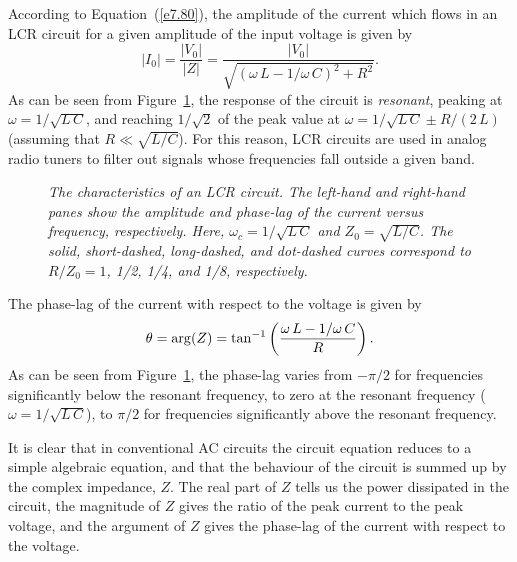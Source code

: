 According to Equation~(\ref{e7.80}), the amplitude of the current which flows in an LCR circuit
for a given amplitude of the input voltage  is
given by
\begin{equation}
|I_0| = \frac{|V_0|}{|Z|}= \frac{|V_0|}{\sqrt{(\omega \,L-1/\omega \,C)^2 + R^2}}.
\end{equation}
As can be seen from Figure~\ref{flcr1}, the response of the circuit is
  {\em resonant}, peaking at $\omega = 1/\sqrt{L\,C}$, and reaching
$1/\sqrt{2}$ of the peak value at $\omega = 1/\sqrt{L\,C} \pm R/(2\,L)$ (assuming that
$R \ll \sqrt{L/C}$). For this reason, LCR circuits are used in analog radio tuners to filter out
signals whose frequencies fall outside a given band. 
\begin{figure}
\epsfysize=2.25in
\centerline{}
\caption{\em The characteristics of an LCR circuit. The left-hand and right-hand panes show the amplitude and phase-lag of the current versus frequency, respectively. Here, $\omega_c=1/\sqrt{L\,C}$ and $Z_0 = \sqrt{L/C}$. The solid, short-dashed, long-dashed,
and dot-dashed curves correspond to $R/Z_0 = 1$, 1/2, 1/4, and 1/8, respectively.}\label{flcr1}
\end{figure}

The phase-lag of the current with respect to the voltage is given by
\begin{equation}
\theta = {\rm arg}(Z) = \tan^{-1}\left( \frac{\omega \,L - 1/\omega\, C }
{R} \right).
\end{equation}
As can be seen from Figure~\ref{flcr1}, the phase-lag varies from $-\pi/2$ for frequencies significantly  below the resonant
frequency, to zero at the resonant frequency ($\omega = 1/\sqrt{L\,C}$), to
$\pi/2$ for frequencies significantly above the resonant frequency.

It is clear that in conventional AC circuits the circuit equation reduces to a
simple algebraic equation, and that the behaviour of the circuit is summed up
by the complex impedance, $Z$. The real part of  $Z$ tells us the power dissipated in
the circuit, the magnitude of $Z$ gives the ratio of the peak current to the
peak voltage, and the argument of $Z$ gives the phase-lag of the current
with respect to the voltage. 

